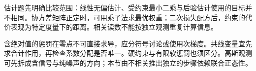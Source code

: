 估计题先明确比较范围：线性无偏估计、受约束最小二乘与后验估计使用的目标并不相同。协方差矩阵正定时，可用乘子法求最优权重；二次损失配方后，约束的代价表现为特定度量下的距离。相关读数不能按独立观测重复计算信息。

含绝对值的惩罚在零点不可直接求导，应分符号讨论或使用次梯度。共线变量宜先求合计作用，再检查系数分配是否唯一。硬约束与有限软惩罚也须区分。高斯观测可先拆成含信号与纯噪声的方向；本节由不相关推出独立的步骤依赖联合正态性。
\par\smallskip
